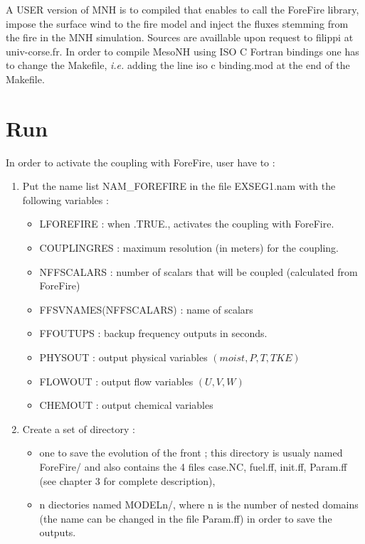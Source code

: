 A USER version of MNH is to compiled that enables to call the ForeFire library, impose the surface wind to the fire model and inject the fluxes stemming from the fire in the MNH simulation. Sources are availlable upon request to filippi at univ-corse.fr. In order to compile MesoNH using ISO C Fortran bindings one has to change the Makefile, \textit{i.e.} adding the line iso c binding.mod at the end of the Makefile.

\section{Run}

In order to activate the coupling with ForeFire, user have to :
\begin{enumerate}
\item Put the name list NAM\_FOREFIRE in the file EXSEG1.nam with the following variables :
\begin{itemize}
\item LFOREFIRE : when .TRUE., activates the coupling with ForeFire.
\item COUPLINGRES : maximum resolution (in meters) for the coupling.
\item NFFSCALARS : number of scalars that will be coupled (calculated from ForeFire)
\item FFSVNAMES(NFFSCALARS) : name of scalars
\item FFOUTUPS : backup frequency outputs in seconds.
\item PHYSOUT : output physical variables $(moist, P, T, TKE)$
\item FLOWOUT : output flow variables $(U,V,W)$
\item CHEMOUT : output chemical variables
\end{itemize}
\item Create a set of directory :
\begin{itemize}
\item one to save the evolution of the front ; this directory is usualy named ForeFire/ and also contains the 4 files case.NC, fuel.ff, init.ff, Param.ff (see chapter 3 for complete description),
\item n diectories named MODELn/, where n is the number of nested domains (the name can be changed in the file Param.ff) in order to save the outputs.
\end{itemize}
\end{enumerate}

